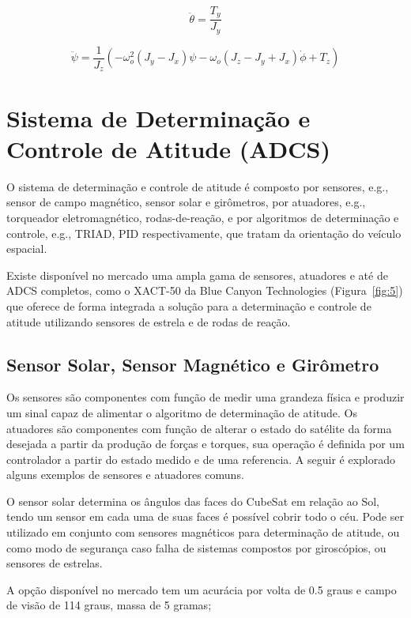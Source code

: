 \begin{equation}
\ddot{\theta}=\frac{T_y}{J_y}
\end{equation}

\begin{equation}
\ddot{\psi}=\frac{1}{J_z}(-\omega_o^2(J_y-J_x)\psi-\omega_o(J_z-J_y+J_x)\dot{\phi}+T_z)
\end{equation}



\section{Sistema de Determinação e Controle de Atitude (ADCS)}\label{sec:3.1.4}

O sistema de determinação e controle de atitude é composto por sensores, {e.g.}, sensor de campo magnético, sensor solar e girômetros, por atuadores, {e.g.}, torqueador eletromagnético, rodas-de-reação, e por algoritmos de determinação e controle, {e.g.}, TRIAD, PID respectivamente, que tratam da orientação do veículo espacial.

Existe disponível no mercado uma ampla gama de sensores, atuadores e até de ADCS completos, como o XACT-50 da Blue Canyon Technologies  (Figura~\ref{fig:5}) que oferece de forma integrada a solução para a determinação e controle de atitude utilizando sensores de estrela e de rodas de reação.

\subsection{Sensor Solar, Sensor Magnético e Girômetro}\label{sec:3.1.4.1}

Os sensores são componentes com  função de medir uma grandeza física e produzir um sinal capaz de alimentar o algoritmo de determinação de atitude. Os atuadores são componentes com função de alterar o estado do satélite da forma desejada a partir da produção de forças e torques, sua operação é definida por um controlador a partir do estado medido e de uma referencia. A seguir é explorado alguns exemplos de sensores e atuadores comuns.

O sensor solar determina os ângulos das faces do CubeSat em relação ao Sol, tendo um sensor em cada uma de suas faces é possível cobrir todo o céu. Pode ser utilizado em conjunto com sensores magnéticos para determinação de atitude, ou como modo de segurança caso falha de sistemas compostos por giroscópios, ou sensores de estrelas.

A opção disponível no mercado tem um acurácia por volta de 0.5 graus e campo de visão de 114 graus, massa de 5 gramas;

